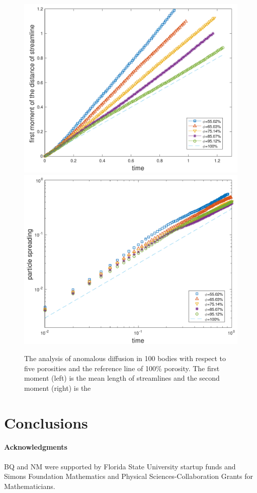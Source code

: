 \documentclass[preprint, 10pt]{elsarticle}
\begin{document}
\begin{figure}[H]
\center
\includegraphics*[width =0.45\linewidth]{./figs/100b_first_moment}
\includegraphics*[width =0.45\linewidth]{./figs/100b_second_moment}
\caption{\label{fig:Eroding100anomalous} The analysis of anomalous diffusion in
 100 bodies with respect to five porosities and the reference line of 100\% porosity.
The first moment (left) is the mean length of streamlines and the second moment (right) is the }
\end{figure}



\section{Conclusions}
\label{sec:conclusions}


\paragraph{\bf Acknowledgments} BQ and NM were supported by Florida
State University startup funds and Simons Foundation Mathematics and
Physical Sciences-Collaboration Grants for Mathematicians.
\end{document}
